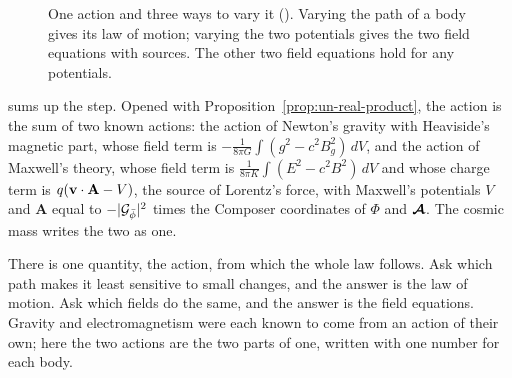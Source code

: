 \begin{figure}[tb]
\myfloatalign
{}
\caption[One action]{One action and three ways to vary it (). Varying the path of a body gives its law of motion; varying the two potentials gives the two field equations with sources. The other two field equations hold for any potentials.}
\label{fig:un-action}
\end{figure}

 sums up the step. Opened with Proposition~\ref{prop:un-real-product}, the action is the sum of two known actions: the action of Newton's gravity with Heaviside's magnetic part, whose field term is $-\frac{1}{8\pi G}\int (g^2 - c^2B_g^2)\,dV$, and the action of Maxwell's theory, whose field term is $\frac{1}{8\pi K}\int (E^2 - c^2B^2)\,dV$ and whose charge term is $q(\mathbf{v}\cdot\mathbf{A} - V)$, the source of Lorentz's force, with Maxwell's potentials $V$ and $\mathbf{A}$ equal to $-|\mathcal{G}_{\bar{\phi}}|^2$ times the Composer coordinates of $\Phi$ and $\boldsymbol{\mathcal{A}}$. The cosmic mass writes the two as one.

\begin{plainwords}
There is one quantity, the action, from which the whole law follows. Ask which path makes it least sensitive to small changes, and the answer is the law of motion. Ask which fields do the same, and the answer is the field equations. Gravity and electromagnetism were each known to come from an action of their own; here the two actions are the two parts of one, written with one number for each body.
\end{plainwords}

